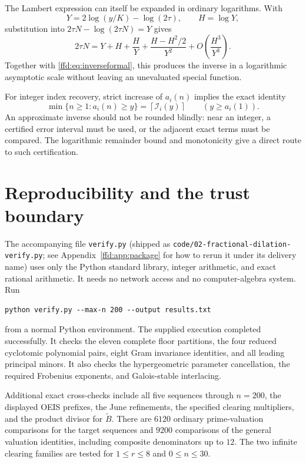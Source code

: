 \documentclass[11pt]{article}
\theoremstyle{definition}
\theoremstyle{remark}
\newcommand{\ceil}[1]{\left\lceil #1\right\rceil}
\newcommand{\tB}{\widetilde B}
\begin{document}
The Lambert expression can itself be expanded in ordinary logarithms.
With
\[
 Y=2\log(y/K)-\log(2\tau),\qquad H=\log Y,
\]
substitution into $2\tau N-\log(2\tau N)=Y$ gives
\begin{equation}
 2\tau N=Y+H+\frac H Y+\frac{H-H^2/2}{Y^2}
 +O\left(\frac{H^3}{Y^3}\right).
 \label{ffd:eq:Wlogs}
\end{equation}
Together with \eqref{ffd:eq:inverseformal}, this produces the inverse in a
logarithmic asymptotic scale without leaving an unevaluated special function.

For integer index recovery, strict increase of $a_i(n)$ implies the exact
identity
\[
 \min\{n\ge1:a_i(n)\ge y\}=\ceil{\mathcal I_i(y)}
 \qquad(y\ge a_i(1)).
\]
An approximate inverse should not be rounded blindly: near an integer,
a certified error interval must be used, or the adjacent exact terms must be
compared. The logarithmic remainder bound and monotonicity give a direct
route to such certification.

\section{Reproducibility and the trust boundary}\label{ffd:sec:verification}
The accompanying file \texttt{verify.py} (shipped as
\nolinkurl{code/02-fractional-dilation-verify.py}; see
Appendix~\ref{ffd:app:package} for how to rerun it under its delivery name) uses only the Python standard library,
integer arithmetic, and exact rational arithmetic. It needs no network access
and no computer-algebra system. Run
\begin{verbatim}
python verify.py --max-n 200 --output results.txt
\end{verbatim}
from a normal Python environment. The supplied execution completed
successfully. It checks the eleven complete floor partitions, the four reduced
cyclotomic polynomial pairs, eight Gram invariance identities, and all leading
principal minors. It also checks the hypergeometric parameter cancellation,
the required Frobenius exponents, and Galois-stable interlacing.

Additional exact cross-checks include all five sequences through $n=200$,
the displayed OEIS prefixes, the June refinements, the specified clearing
multipliers, and the product divisor for $\tB$. There are $6120$ ordinary
prime-valuation comparisons for the target sequences and $9200$ comparisons
of the general valuation identities, including composite denominators up to
$12$. The two infinite clearing families are tested for $1\le r\le8$ and
$0\le n\le30$.
\end{document}
